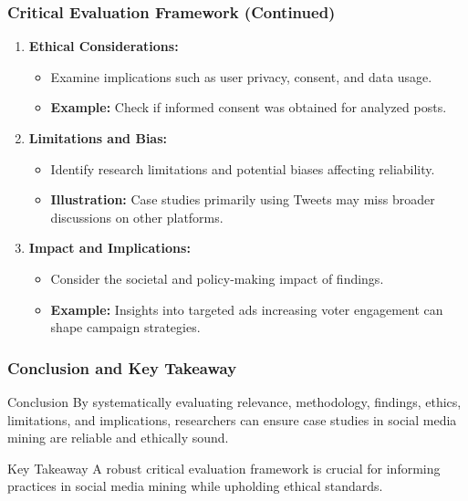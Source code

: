 \documentclass{beamer}
\begin{document}
\begin{frame}[fragile]
    \frametitle{Critical Evaluation Framework (Continued)}
    \begin{enumerate}[resume]
        \item \textbf{Ethical Considerations:}
            \begin{itemize}
                \item Examine implications such as user privacy, consent, and data usage.
                \item \textbf{Example:} Check if informed consent was obtained for analyzed posts.
            \end{itemize}
        \item \textbf{Limitations and Bias:}
            \begin{itemize}
                \item Identify research limitations and potential biases affecting reliability.
                \item \textbf{Illustration:} Case studies primarily using Tweets may miss broader discussions on other platforms.
            \end{itemize}
        \item \textbf{Impact and Implications:}
            \begin{itemize}
                \item Consider the societal and policy-making impact of findings.
                \item \textbf{Example:} Insights into targeted ads increasing voter engagement can shape campaign strategies.
            \end{itemize}
    \end{enumerate}
\end{frame}

\begin{frame}[fragile]
    \frametitle{Conclusion and Key Takeaway}
    \begin{block}{Conclusion}
        By systematically evaluating relevance, methodology, findings, ethics, limitations, and implications, researchers can ensure case studies in social media mining are reliable and ethically sound.
    \end{block}
    \begin{block}{Key Takeaway}
        A robust critical evaluation framework is crucial for informing practices in social media mining while upholding ethical standards.
    \end{block}
\end{frame}
\end{document}
